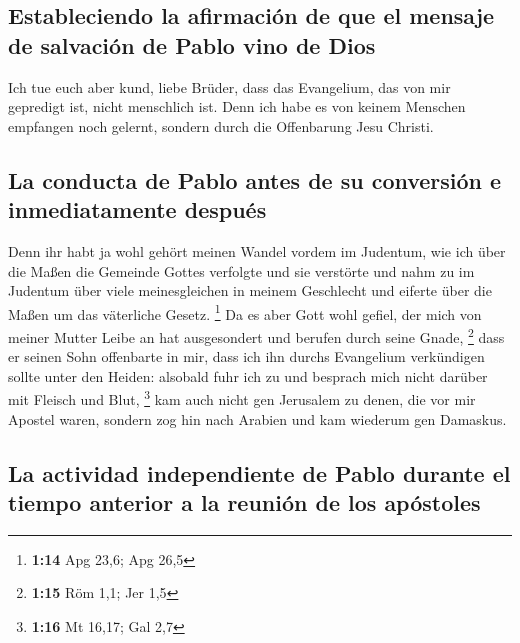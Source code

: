 \hypertarget{estableciendo-la-afirmaciuxf3n-de-que-el-mensaje-de-salvaciuxf3n-de-pablo-vino-de-dios}{%
\subsection{Estableciendo la afirmación de que el mensaje de salvación
de Pablo vino de
Dios}\label{estableciendo-la-afirmaciuxf3n-de-que-el-mensaje-de-salvaciuxf3n-de-pablo-vino-de-dios}}

 Ich tue euch aber kund, liebe Brüder, dass das
Evangelium, das von mir gepredigt ist, nicht menschlich ist.
 Denn ich habe es von keinem Menschen empfangen noch
gelernt, sondern durch die Offenbarung Jesu Christi.

\hypertarget{la-conducta-de-pablo-antes-de-su-conversiuxf3n-e-inmediatamente-despuuxe9s}{%
\subsection{La conducta de Pablo antes de su conversión e inmediatamente
después}\label{la-conducta-de-pablo-antes-de-su-conversiuxf3n-e-inmediatamente-despuuxe9s}}

 Denn ihr habt ja wohl gehört meinen Wandel vordem im
Judentum, wie ich über die Maßen die Gemeinde Gottes verfolgte und sie
verstörte  und nahm zu im Judentum über viele
meinesgleichen in meinem Geschlecht und eiferte über die Maßen um das
väterliche Gesetz. \footnote{\textbf{1:14} Apg 23,6; Apg 26,5}
 Da es aber Gott wohl gefiel, der mich von meiner Mutter
Leibe an hat ausgesondert und berufen durch seine Gnade, \footnote{\textbf{1:15}
  Röm 1,1; Jer 1,5}  dass er seinen Sohn offenbarte in
mir, dass ich ihn durchs Evangelium verkündigen sollte unter den Heiden:
alsobald fuhr ich zu und besprach mich nicht darüber mit Fleisch und
Blut, \footnote{\textbf{1:16} Mt 16,17; Gal 2,7}  kam
auch nicht gen Jerusalem zu denen, die vor mir Apostel waren, sondern
zog hin nach Arabien und kam wiederum gen Damaskus.

\hypertarget{la-actividad-independiente-de-pablo-durante-el-tiempo-anterior-a-la-reuniuxf3n-de-los-apuxf3stoles}{%
\subsection{La actividad independiente de Pablo durante el tiempo
anterior a la reunión de los
apóstoles}\label{la-actividad-independiente-de-pablo-durante-el-tiempo-anterior-a-la-reuniuxf3n-de-los-apuxf3stoles}}

